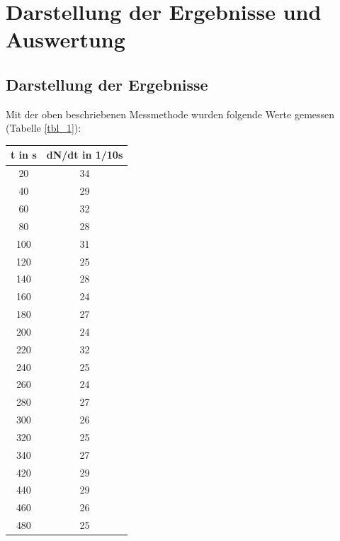 \section{Darstellung der Ergebnisse und Auswertung}

\subsection{Darstellung der Ergebnisse}
Mit der oben beschriebenen Messmethode wurden folgende Werte gemessen (Tabelle \ref{tbl_1}):
\begin{table}
\centering
\begin{tabular}{c|c}
t in s & dN/dt in 1/10s \\ 
\toprule
20	&34\\ 

40	&29\\ 

60	&32\\ 

80	&28\\ 

100	&31\\ 

120	&25\\ 

140	&28\\ 

160	&24\\ 

180	&27\\ 

200	&24\\ 

220	&32\\ 

240	&25\\ 

260	&24\\ 

280	&27\\ 
	
300	&26\\ 

320	&25\\ 

340	&27\\ 

420	&29\\ 
	
440	&29\\ 

460	&26\\ 

480	&25\\ 


\end{tabular}
\end{table}

